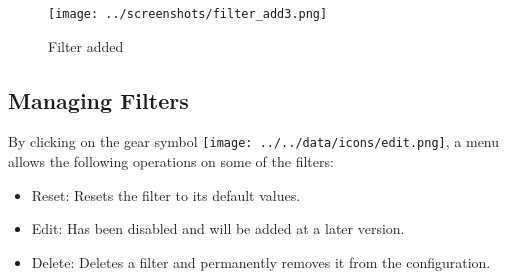 \begin{figure}[H]
  \center
    \texttt{[image: ../screenshots/filter\_add3.png]}
  \caption{Filter added}
  \label{fig:filter_add3}
\end{figure}

\subsection{Managing Filters}
\label{sec:filter_management}

By clicking on the gear symbol \texttt{[image: ../../data/icons/edit.png]}, a menu allows the following operations on some of the filters:

\begin{itemize}  
\item Reset: Resets the filter to its default values.
\item Edit: Has been disabled and will be added at a later version.
\item Delete: Deletes a filter and permanently removes it from the configuration.
\end{itemize}
 
